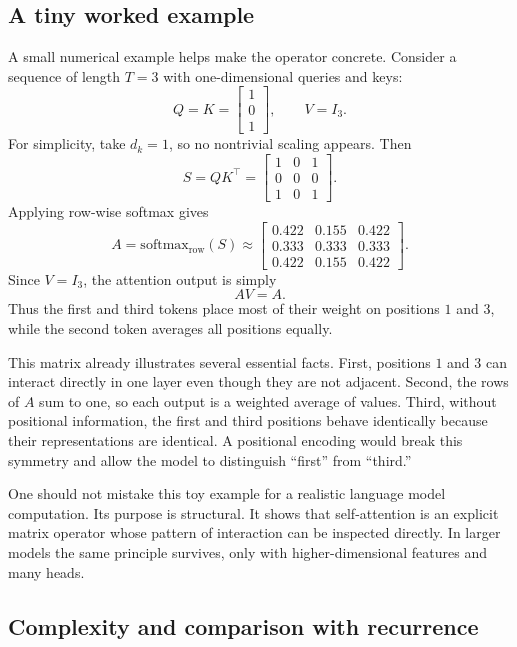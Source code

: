 \subsection*{A tiny worked example}

A small numerical example helps make the operator concrete.
Consider a sequence of length \(T=3\) with one-dimensional queries and keys:
\[
Q = K =
\begin{bmatrix}
1\\
0\\
1
\end{bmatrix},
\qquad
V = I_3.
\]
For simplicity, take \(d_k = 1\), so no nontrivial scaling appears.
Then
\[
S = QK^{\top}
=
\begin{bmatrix}
1 & 0 & 1\\
0 & 0 & 0\\
1 & 0 & 1
\end{bmatrix}.
\]
Applying row-wise softmax gives
\[
A
=
\mathrm{softmax}_{\mathrm{row}}(S)
\approx
\begin{bmatrix}
0.422 & 0.155 & 0.422\\
0.333 & 0.333 & 0.333\\
0.422 & 0.155 & 0.422
\end{bmatrix}.
\]
Since \(V = I_3\), the attention output is simply
\[
AV = A.
\]
Thus the first and third tokens place most of their weight on positions \(1\) and \(3\), while the second token averages all positions equally.

\begin{example}
This matrix already illustrates several essential facts.
First, positions \(1\) and \(3\) can interact directly in one layer even though they are not adjacent.
Second, the rows of \(A\) sum to one, so each output is a weighted average of values.
Third, without positional information, the first and third positions behave identically because their representations are identical.
A positional encoding would break this symmetry and allow the model to distinguish ``first'' from ``third.'' 
\end{example}

One should not mistake this toy example for a realistic language model computation.
Its purpose is structural.
It shows that self-attention is an explicit matrix operator whose pattern of interaction can be inspected directly.
In larger models the same principle survives, only with higher-dimensional features and many heads.

\subsection*{Complexity and comparison with recurrence}

